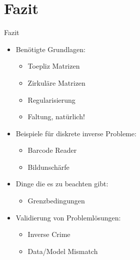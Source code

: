 \documentclass[11pt]{beamer}
\begin{document}
\section{Fazit}
\begin{frame}{Fazit}
\begin{itemize}
\item Benötigte Grundlagen:
\pause
  \begin{itemize}
  \item Toepliz Matrizen
  \pause
  \item Zirkuläre Matrizen
  \pause
  \item Regularisierung
  \pause
  \item Faltung, natürlich!
  \pause
  \end{itemize}
\item Beispiele für diskrete inverse Probleme:
\pause
  \begin{itemize}
  \item Barcode Reader
  \pause
  \item Bildunschärfe
  \pause
  \end{itemize}
\item Dinge die es zu beachten gibt:
\pause
  \begin{itemize}
  \item Grenzbedingungen
  \pause
  \end{itemize}
\item Validierung von Problemlösungen:
\pause
  \begin{itemize}
  \item Inverse Crime
  \pause
  \item Data/Model Mismatch
  \end{itemize}
\end{itemize}
\end{frame}
\end{document}
